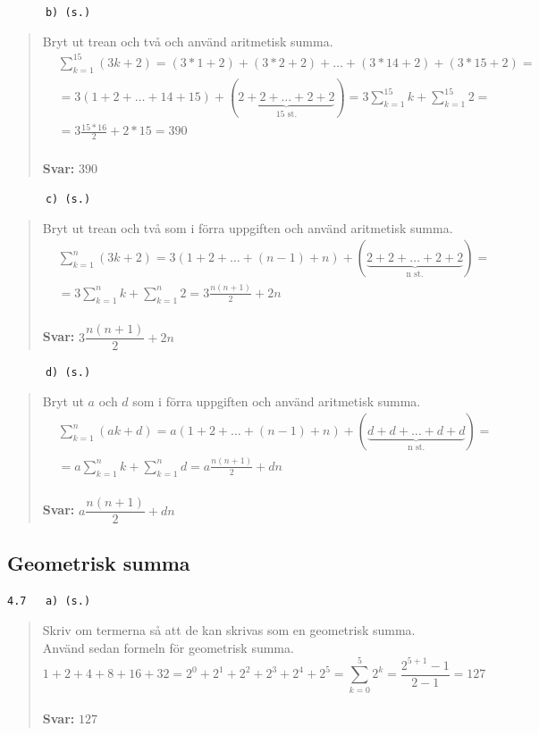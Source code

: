 \documentclass[a4paper]{article}
\newcommand{\tskcol}[1]{\textcolor{tskcol}{#1}}
\begin{document}
	\texttt{\tskcol{~~~~~~b) (s.)}}
	\begin{quotation}
		\noindent
		Bryt ut trean och två och använd aritmetisk summa.
		\begin{align*}
		&\sum_{k=1}^{15}(3k+2)=
		(3*1+2)+(3*2+2)+\ldots+(3*14+2)+(3*15+2)= \\
		&=3(1+2+\ldots+14+15)+(\underbrace{2+2+\ldots+2+2}_\text{15 st.})=
		3\sum_{k=1}^{15}k+\sum_{k=1}^{15}2= \\
		&=3\frac{15*16}{2}+2*15=
		390
		\end{align*}
		\\
		\textbf{Svar:} $390$
	\end{quotation}
	
	\texttt{\tskcol{~~~~~~c) (s.)}}
	\begin{quotation}
		\noindent
		Bryt ut trean och två som i förra uppgiften och använd aritmetisk summa.
		\begin{align*}
		&\sum_{k=1}^{n}(3k+2)=
		3(1+2+\ldots+(n-1)+n)+(\underbrace{2+2+\ldots+2+2}_\text{n st.})= \\
		&=3\sum_{k=1}^{n}k+\sum_{k=1}^{n}2=
		3\frac{n(n+1)}{2}+2n
		\end{align*}
		\\
		\textbf{Svar:} $3\dfrac{n(n+1)}{2}+2n$
	\end{quotation}
	
	\texttt{\tskcol{~~~~~~d) (s.)}}
	\begin{quotation}
		\noindent
		Bryt ut $a$ och $d$ som i förra uppgiften och använd aritmetisk summa.
		\begin{align*}
		&\sum_{k=1}^{n}(ak+d)=
		a(1+2+\ldots+(n-1)+n)+(\underbrace{d+d+\ldots+d+d}_\text{n st.})= \\
		&=a\sum_{k=1}^{n}k+\sum_{k=1}^{n}d=
		a\frac{n(n+1)}{2}+dn
		\end{align*}
		\\
		\textbf{Svar:} $a\dfrac{n(n+1)}{2}+dn$
	\end{quotation}
	
	\subsection*{Geometrisk summa}
	
	\texttt{\tskcol{4.7~~~a) (s.)}}
	\begin{quotation}
		\noindent
		Skriv om termerna så att de kan skrivas som en geometrisk summa. Använd sedan formeln för geometrisk summa.
		\[1+2+4+8+16+32=
		2^0+2^1+2^2+2^3+2^4+2^5=
		\sum_{k=0}^{5}2^k=
		\frac{2^{5+1}-1}{2-1}=
		127\]
		\\
		\textbf{Svar:} $127$
	\end{quotation}
	
\end{document}
